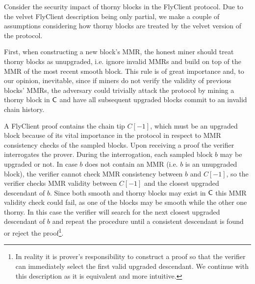 	Consider the security impact of thorny blocks in the FlyClient protocol.
	Due to the velvet FlyClient description being only partial, we
	make a couple of assumptions considering how thorny blocks are treated by the velvet version of the protocol.

	First, when constructing a new block's MMR, the honest miner should treat thorny blocks as unupgraded, 
	i.e. ignore invalid MMRs and build on top of the MMR of the most recent smooth block. 
	This rule is of great importance and, to our opinion, inevitable, since if miners do not verify the 
	validity of previous blocks' MMRs, the adversary could trivially attack the protocol by mining a thorny block in $\mathsf{C}$ and have all subsequent upgraded
	blocks commit to an invalid chain history.  
	
	A FlyClient proof contains the chain tip $C[-1]$, which must be an upgraded block because of its vital importance in the protocol in respect to MMR consistency checks of the sampled blocks. 
	Upon receiving a proof the verifier interrogates the prover. During the interrogation, each sampled block $b$ may
	be upgraded or not. In case $b$ does not contain an MMR (i.e. $b$ is an unupgraded block), the verifier cannot check MMR consistency
	between $b$ and $C[-1]$, so the verifier checks MMR validity between $C[-1]$ and the closest upgraded descendant of $b$.
	Since both smooth and thorny blocks may exist in $\mathsf{C}$ this MMR validity check could fail, as one of the blocks may be smooth while the other one thorny.
	In this case the verifier will search for the next closest upgraded descendant of $b$ and repeat the procedure until a consistent descendant is found or reject 
	the proof\footnote{
	In reality it is prover's responsibility to construct a proof so that the verifier can immediately select the first valid upgraded descendant. We continue 
	with this description as it is equivalent and more intuitive.
	}.


